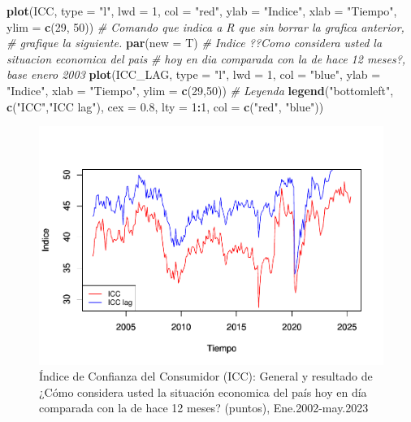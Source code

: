 \documentclass[
]{book}
\newenvironment{Shaded}{\begin{snugshade}}{\end{snugshade}}
\newcommand{\AttributeTok}[1]{\textcolor[rgb]{0.13,0.29,0.53}{#1}}
\newcommand{\CommentTok}[1]{\textcolor[rgb]{0.56,0.35,0.01}{\textit{#1}}}
\newcommand{\DecValTok}[1]{\textcolor[rgb]{0.00,0.00,0.81}{#1}}
\newcommand{\FloatTok}[1]{\textcolor[rgb]{0.00,0.00,0.81}{#1}}
\newcommand{\FunctionTok}[1]{\textcolor[rgb]{0.13,0.29,0.53}{\textbf{#1}}}
\newcommand{\NormalTok}[1]{#1}
\newcommand{\SpecialCharTok}[1]{\textcolor[rgb]{0.81,0.36,0.00}{\textbf{#1}}}
\newcommand{\StringTok}[1]{\textcolor[rgb]{0.31,0.60,0.02}{#1}}
\begin{document}
\begin{Shaded}
\begin{Highlighting}[]
\FunctionTok{plot}\NormalTok{(ICC, }\AttributeTok{type =} \StringTok{"l"}\NormalTok{, }\AttributeTok{lwd =} \DecValTok{1}\NormalTok{, }\AttributeTok{col =} \StringTok{"red"}\NormalTok{, }\AttributeTok{ylab =} \StringTok{"Indice"}\NormalTok{, }
     \AttributeTok{xlab =} \StringTok{"Tiempo"}\NormalTok{, }\AttributeTok{ylim =} \FunctionTok{c}\NormalTok{(}\DecValTok{29}\NormalTok{, }\DecValTok{50}\NormalTok{))}
\CommentTok{\# Comando que indica a R que sin borrar la grafica anterior, }
\CommentTok{\# grafique la siguiente.}
\FunctionTok{par}\NormalTok{(}\AttributeTok{new =}\NormalTok{ T) }
\CommentTok{\# Indice ??Como considera usted la situacion economica del pais }
\CommentTok{\# hoy en dia comparada con la de hace 12 meses?, base enero 2003}
\FunctionTok{plot}\NormalTok{(ICC\_LAG, }\AttributeTok{type =} \StringTok{"l"}\NormalTok{, }\AttributeTok{lwd =} \DecValTok{1}\NormalTok{, }\AttributeTok{col =} \StringTok{"blue"}\NormalTok{, }\AttributeTok{ylab =} \StringTok{"Indice"}\NormalTok{, }
     \AttributeTok{xlab =} \StringTok{"Tiempo"}\NormalTok{, }\AttributeTok{ylim =} \FunctionTok{c}\NormalTok{(}\DecValTok{29}\NormalTok{,}\DecValTok{50}\NormalTok{))}
\CommentTok{\# Leyenda}
\FunctionTok{legend}\NormalTok{(}\StringTok{"bottomleft"}\NormalTok{, }\FunctionTok{c}\NormalTok{(}\StringTok{"ICC"}\NormalTok{,}\StringTok{"ICC lag"}\NormalTok{), }\AttributeTok{cex =} \FloatTok{0.8}\NormalTok{, }\AttributeTok{lty =} \DecValTok{1}\SpecialCharTok{:}\DecValTok{1}\NormalTok{, }
       \AttributeTok{col =} \FunctionTok{c}\NormalTok{(}\StringTok{"red"}\NormalTok{, }\StringTok{"blue"}\NormalTok{))}
\end{Highlighting}
\end{Shaded}

\begin{figure}

{\centering \includegraphics{Notas-Series-Tiempo_files/figure-latex/fig2-1} 

}

\caption{Índice de Confianza del Consumidor (ICC): General y resultado de ¿Cómo considera usted la situación economica del país hoy en día comparada con la de hace 12 meses? (puntos), Ene.2002-may.2023}\label{fig:fig2}
\end{figure}
\end{document}
